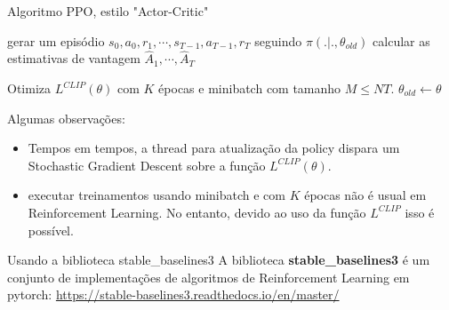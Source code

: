 \documentclass{beamer}
\begin{document}
\begin{frame}{Algoritmo PPO, estilo "Actor-Critic"}
	
	\begin{algorithmic} 
		\STATE gerar um episódio ${s_{0},a_{0},r_{1},\cdots,s_{T-1},a_{T-1},r_{T}}$ seguindo $\pi(.|.,\theta_{old})$
		\STATE calcular as estimativas de vantagem $\hat{A}_{1}, \cdots, \hat{A}_{T}$
		\ENDFOR
		
		\STATE \TB Otimiza $L^{CLIP}(\theta)$ com $K$ épocas e minibatch com tamanho $M \leq NT$. 
		\STATE \TB $\theta_{old} \leftarrow \theta$
		
		\ENDFOR
	\end{algorithmic}	
	
	Algumas observações: 
	
	\begin{itemize}
		\item Tempos em tempos, a thread para atualização da policy dispara um Stochastic Gradient Descent sobre a função $L^{CLIP}(\theta)$. 
		\item executar treinamentos usando minibatch e com $K$ épocas não é usual em Reinforcement Learning. No entanto, devido ao uso da função $L^{CLIP}$ isso é possível.  
	\end{itemize}
	
\end{frame}


\begin{frame}{Usando a biblioteca stable\_baselines3}
	A biblioteca \textbf{stable\_baselines3} é um conjunto de implementações de algoritmos de Reinforcement Learning em pytorch: \href{https://stable-baselines3.readthedocs.io/en/master/}{https://stable-baselines3.readthedocs.io/en/master/} 
	
	\tiny
	
\end{frame}
\end{document}
